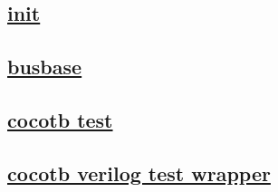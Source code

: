 \documentclass{article}
\begin{document}
  


  \subsection{\href{../files/__init__-py.html}{init}}
  \subsection{\href{../files/busbase-py.html}{busbase}}
  \subsection{\href{../files2/test-py.html}{cocotb test}}
  \subsection{\href{../files2/test-v.html}{cocotb verilog test wrapper}}
\end{document}
